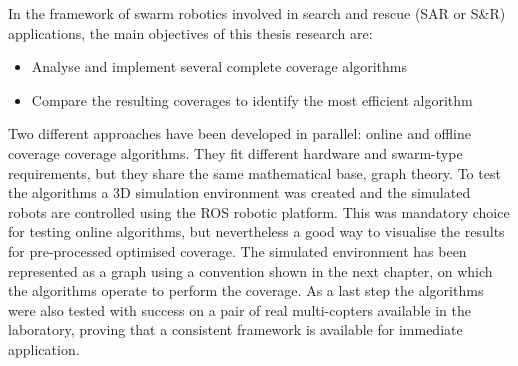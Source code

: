 In the framework of swarm robotics involved in search and rescue (SAR or S\&R) applications, the main objectives of this thesis research are:
\begin{itemize}
\item Analyse and implement several complete coverage algorithms
\item Compare the resulting coverages to identify the most efficient algorithm
\end{itemize}

Two different approaches have been developed in parallel: online and offline coverage coverage algorithms. They fit different hardware and swarm-type requirements, but they share the same mathematical base, graph theory. To test the algorithms a 3D simulation environment was created and the simulated robots are controlled using the ROS robotic platform. This was mandatory choice for testing online algorithms, but nevertheless a good way to visualise the results for pre-processed optimised coverage.
The simulated environment has been represented as a graph using a convention shown in the next chapter, on which the algorithms operate to perform the coverage. As a last step the algorithms were also tested with success on a pair of real multi-copters available in the laboratory, proving that a consistent framework is available for immediate application.
















